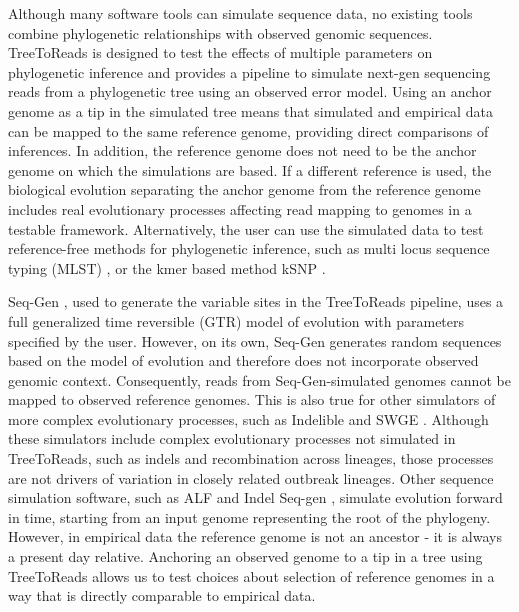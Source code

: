 \documentclass{bmcart}
\begin{document}
Although many software tools can simulate sequence data, no existing tools combine phylogenetic relationships with observed genomic sequences.
TreeToReads is designed to test the effects of multiple parameters on phylogenetic inference
and provides a pipeline to simulate next-gen sequencing reads from a phylogenetic tree using an observed error model.
Using an anchor genome as a tip in the simulated tree means that simulated and empirical data can be mapped to the same reference genome, providing direct comparisons of inferences.
In addition, the reference genome does not need to be the anchor genome on which the simulations are based.
If a different reference is used, the biological evolution separating the anchor genome from the reference genome includes real evolutionary processes affecting read mapping to genomes in a testable framework.
Alternatively, the user can use the simulated data to test reference-free methods for phylogenetic inference, such as multi locus sequence typing (MLST) \cite{pightling_listeria_2015}, or the kmer based method kSNP \cite{gardner_when_2013}.

Seq-Gen \cite{rambaut_seq-gen:_1997}, used to generate the variable sites in the TreeToReads pipeline, uses a full generalized time reversible (GTR) model of evolution  with parameters specified by the user.
However, on its own, Seq-Gen generates random sequences based on the model of evolution and therefore does not incorporate observed genomic context.
Consequently, reads from Seq-Gen-simulated genomes cannot be mapped to observed reference genomes.
This is also true for other simulators of more complex evolutionary processes, such as Indelible \cite{fletcher_indelible:_2009} and SWGE \cite{arenas_simulation_2014}.
Although these simulators include complex evolutionary processes not simulated in TreeToReads, such as indels and recombination across lineages, those processes are not drivers of variation in closely related outbreak lineages.
Other sequence simulation software, such as ALF \cite{dalquen_alfsimulation_2012} and Indel Seq-gen \cite{strope_indel-seq-gen:_2007}, simulate evolution forward in time, starting from an input  genome representing the root of the phylogeny.
However, in empirical data the reference genome is not an ancestor - it is always a present day relative.
Anchoring an observed genome to a tip in a tree using TreeToReads allows us to test choices about selection of reference genomes in a way that is directly comparable to empirical data. 
\end{document}
